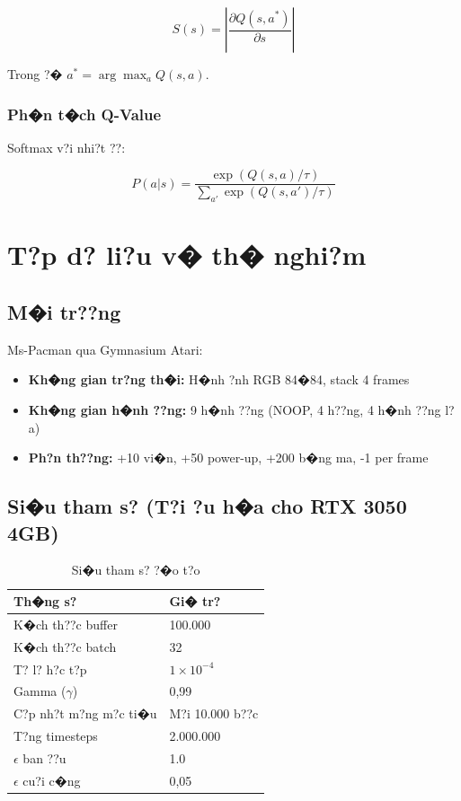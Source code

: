 \documentclass[11pt,a4paper]{article}
\begin{document}
\begin{equation}
S(s) = \left|\frac{\partial Q(s,a^*)}{\partial s}\right|
\end{equation}

Trong ?� $a^* = \arg\max_a Q(s,a)$.

\subsubsection{Ph�n t�ch Q-Value}

Softmax v?i nhi?t ??:

\begin{equation}
P(a|s) = \frac{\exp(Q(s,a)/\tau)}{\sum_{a'}\exp(Q(s,a')/\tau)}
\end{equation}

\section{T?p d? li?u v� th� nghi?m}

\subsection{M�i tr??ng}

Ms-Pacman qua Gymnasium Atari:
\begin{itemize}
    \item \textbf{Kh�ng gian tr?ng th�i:} H�nh ?nh RGB 84�84, stack 4 frames
    \item \textbf{Kh�ng gian h�nh ??ng:} 9 h�nh ??ng (NOOP, 4 h??ng, 4 h�nh ??ng l?a)
    \item \textbf{Ph?n th??ng:} +10 vi�n, +50 power-up, +200 b�ng ma, -1 per frame
\end{itemize}

\subsection{Si�u tham s? (T?i ?u h�a cho RTX 3050 4GB)}

\begin{table}[H]
\centering
\small
\begin{tabular}{ll}
\toprule
\textbf{Th�ng s?} & \textbf{Gi� tr?} \\
\midrule
K�ch th??c buffer & 100.000 \\
K�ch th??c batch & 32 \\
T? l? h?c t?p & $1 \times 10^{-4}$ \\
Gamma ($\gamma$) & 0,99 \\
C?p nh?t m?ng m?c ti�u & M?i 10.000 b??c \\
T?ng timesteps & 2.000.000 \\
$\epsilon$ ban ??u & 1.0 \\
$\epsilon$ cu?i c�ng & 0,05 \\
\bottomrule
\end{tabular}
\caption{Si�u tham s? ?�o t?o}
\end{table}
\end{document}
